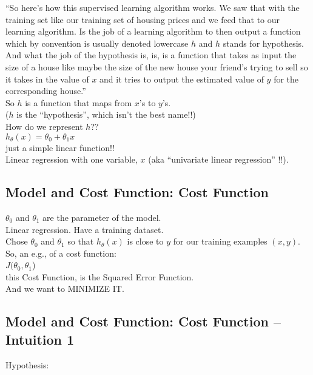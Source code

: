 \documentclass[11pt,a4paper]{article}
\begin{document}
``So here's how this supervised learning algorithm works. We saw that
with the training set like our training set of housing prices and we
feed that to our learning algorithm. Is the job of a learning
algorithm to then output a function which by convention is usually
denoted lowercase $h$ and $h$ stands for hypothesis. And what the job
of the hypothesis is, is, is a function that takes as input the size
of a house like maybe the size of the new house your friend's trying
to sell so it takes in the value of $x$ and it tries to output the
estimated value of $y$ for the corresponding house.'' \\

So $h$ is a function that maps from $x$'s to $y$'s. \\
($h$ is the ``hypothesis'', which isn't the best name!!) \\

How do we represent $h$??\\
$h_{\theta}(x) = \theta_{0} + \theta_{1} x$\\
just a simple linear function!!\\
Linear regression with one variable, $x$ 
(aka ``univariate linear regression'' !!). 


\subsection{Model and Cost Function: Cost Function}
$\theta_{0}$ and $\theta_{1}$ are the parameter of the model. \\
Linear regression. Have a training dataset. \\

Chose $\theta_{0}$ and $\theta_{1}$ so that $h_{\theta}(x)$ is close
to $y$ for our training examples $(x,y)$. \\

So, an e.g., of a cost function:\\
$J(\theta_{0}, \theta_{1}$)\\
this Cost Function, is the Squared Error Function. \\
And we want to MINIMIZE IT.\\



\subsection{Model and Cost Function: Cost Function -- Intuition 1}

\noindent
Hypothesis:\\
\end{document}
